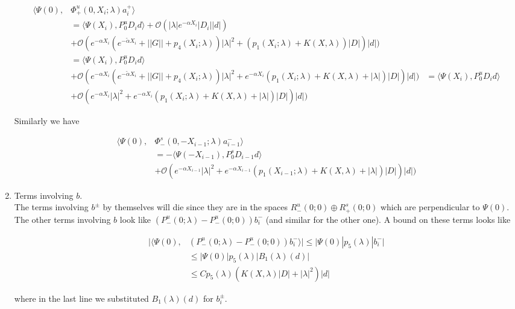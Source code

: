 \documentclass[12pt]{article}
\begin{document}
\begin{enumerate}
\begin{align*}
\langle \Psi(0), &\Phi^u_+(0, X_i; \lambda) a_i^+ \rangle \\
&= \langle \Psi(X_i), P^u_0 D_i d \rangle  + \mathcal{O}(|\lambda| e^{-\alpha X_i}|D_i||d|) \\
&+ \mathcal{O}(e^{-\alpha X_i}(e^{-\tilde{\alpha} X_i} + ||G|| + p_4(X_i; \lambda))|\lambda|^2 + (p_1(X_i; \lambda) + K(X, \lambda) ) |D|)|d|) \\
&= \langle \Psi(X_i), P^u_0 D_i d \rangle \\
&+ \mathcal{O}(e^{-\alpha X_i}(e^{-\tilde{\alpha} X_i} + ||G|| + p_4(X_i; \lambda))|\lambda|^2 + e^{-\alpha X_i}(p_1(X_i; \lambda) + K(X, \lambda) + |\lambda|) |D|)|d|)
&= \langle \Psi(X_i), P^u_0 D_i d \rangle \\
&+ \mathcal{O}(e^{-\alpha X_i}|\lambda|^2 + e^{-\alpha X_i}(p_1(X_i; \lambda) + K(X, \lambda) + |\lambda|) |D|)|d|)
\end{align*}

Similarly we have

\begin{align*}
\langle \Psi(0), &\Phi^s_-(0, -X_{i-1}; \lambda)a_{i-1}^- \rangle \\
&= -\langle \Psi(-X_{i-1}), P^s_0 D_{i-1} d \rangle \\
&+ \mathcal{O}(e^{-\alpha X_{i-1}}|\lambda|^2 + e^{-\alpha X_{i-1}}(p_1(X_{i-1}; \lambda) + K(X, \lambda) + |\lambda|) |D|)|d|)
\end{align*}

\item Terms involving $b$.\\

The terms involving $b^\pm$ by themselves will die since they are in the spaces $R^u_-(0; 0) \oplus R^s_+(0; 0)$ which are perpendicular to $\Psi(0)$.\\

The other terms involving $b$ look like $(P^u_-(0; \lambda) - P^u_-(0; 0))b_i^-$ (and similar for the other one). A bound on these terms looks like

\begin{align*}
|\langle \Psi(0), &(P^u_-(0; \lambda) - P^u_-(0; 0))b_i^- \rangle|
\leq |\Psi(0)| p_5(\lambda)|b_i^-| \\
&\leq |\Psi(0)| p_5(\lambda)|B_1(\lambda)(d)| \\
&\leq C p_5(\lambda) ( K(X, \lambda) |D|+ |\lambda|^2 )|d|
\end{align*}

where in the last line we substituted $B_1(\lambda)(d)$ for $b_i^\pm$.\\


\end{enumerate}
\end{document}

